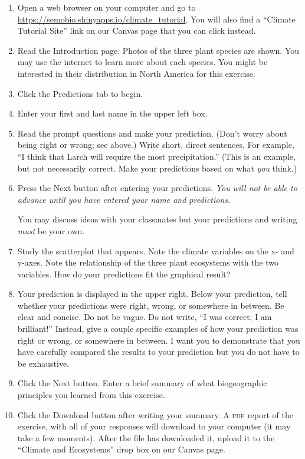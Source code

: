 \documentclass[11pt]{article}
\begin{document}
\begin{enumerate}
	\item Open a web browser on your computer and go to \url{https://semobio.shinyapps.io/climate_tutorial}. You will also find a “Climate Tutorial Site” link on our Canvas page that you can click instead.
	
	\item Read the Introduction page. Photos of the three plant species are shown. You may use the internet to learn more about each species. You might be interested in their distribution in North America for this exercise.
	
	\item Click the Predictions tab to begin. 
	
	\item Enter your first and last name in the upper left box.
	
	\item Read the prompt questions and make your prediction. (Don't worry about being right or wrong; see above.) Write short, direct sentences. For example, “I think that Larch will require the
	most precipitation.” (This is an example, but not necessarily correct. Make your predictions 
	based on what \emph{you} think.)
			
	\item Press the Next button after entering your predictions. \emph{You will not be able to advance until you have entered your name \emph{and} predictions.}
	
	You may discuss ideas with your classmates but your predictions and writing \textit{must} be your own.
	
	\item Study the scatterplot that appears. Note the climate variables on the x- and y-axes.  Note the relationship of the three plant ecosystems with the two variables. How do your predictions fit the graphical result?
	
	\item Your prediction is displayed in the upper right. Below your prediction, tell whether your predictions were right, wrong, or somewhere in between. Be clear and concise. Do not be vague. Do not write, “I was correct; I am brilliant!” Instead, give a couple specific examples of how your prediction was right or wrong, or somewhere in between. I want you to demonstrate that you have carefully compared the results to your prediction but you do not have to be exhaustive.
	
	\item Click the Next button. Enter a brief summary of what biogeographic principles you learned from this exercise. 
	
	\item Click the Download button after writing your summary. A \textsc{pdf} report of the exercise, with all of your responses will download to your computer (it may take a few moments). After the file has downloaded it, upload it to the “Climate and Ecosystems” drop box on our Canvas page.
	
\end{enumerate}
\end{document}
